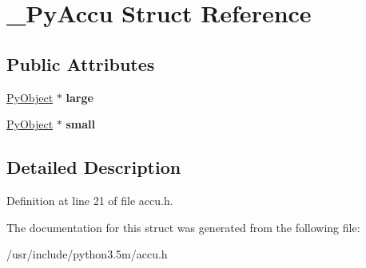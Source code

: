 \hypertarget{struct__PyAccu}{}\section{\+\_\+\+Py\+Accu Struct Reference}
\label{struct__PyAccu}
\subsection*{Public Attributes}
\begin{DoxyCompactItemize}
\item 
\hyperlink{struct__object}{Py\+Object} $\ast$ {\bfseries large}\hypertarget{struct__PyAccu_aa2ba2a9c68c43c7711ea575494d658d5}{}\label{struct__PyAccu_aa2ba2a9c68c43c7711ea575494d658d5}

\item 
\hyperlink{struct__object}{Py\+Object} $\ast$ {\bfseries small}\hypertarget{struct__PyAccu_a4658d6855593da52fee67f6a0c23f6af}{}\label{struct__PyAccu_a4658d6855593da52fee67f6a0c23f6af}

\end{DoxyCompactItemize}


\subsection{Detailed Description}


Definition at line 21 of file accu.\+h.



The documentation for this struct was generated from the following file\+:\begin{DoxyCompactItemize}
\item 
/usr/include/python3.\+5m/accu.\+h\end{DoxyCompactItemize}
